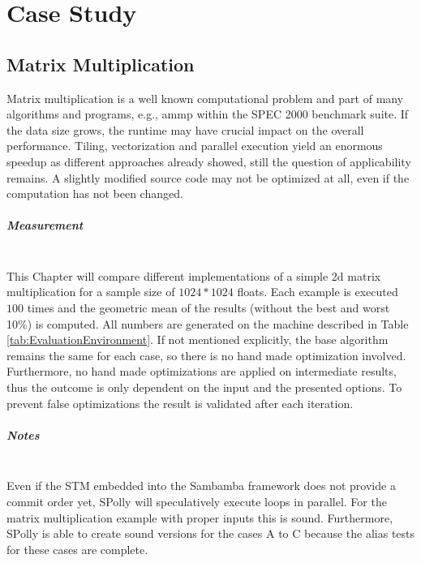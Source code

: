 
\chapter{Case Study} %
\label{Chapter6}


\section{Matrix Multiplication}
\label{MatrixMultiplication}
Matrix multiplication is a well known computational problem and part of many 
algorithms and programs, e.g., ammp within the SPEC 2000 benchmark suite.
If the data size grows, the runtime may have crucial impact on the
overall performance. Tiling, vectorization and parallel execution yield an
enormous speedup as different approaches already
showed\cite{grosser:thesis, JIMBOREAN-2012-664345},
still the question of applicability remains. A slightly modified source code 
may not be optimized at all, even if the computation has not been changed. 

\paragraph{Measurement} ~\\
This Chapter will compare different implementations of a simple 2d
matrix multiplication for a sample size of  $1024*1024$ floats.
Each example is executed $100$ times and the geometric mean of the results 
(without the best and worst 10\%) is computed. All numbers are generated on 
the machine described in Table \ref{tab:EvaluationEnvironment}. 
If not mentioned explicitly, the base
algorithm remains the same for each case, so there is no hand made optimization 
involved. Furthermore, no hand made optimizations are applied on intermediate 
results, thus the outcome is only dependent on the input and the presented 
options. To prevent false optimizations the result is validated after each iteration.

\paragraph{Notes} ~\\
Even if the STM embedded into the Sambamba framework does
not provide a commit order yet, SPolly will speculatively execute loops in
parallel. For the matrix multiplication example with proper inputs 
this is sound. Furthermore, SPolly is able to create sound versions for the cases 
A to C because the alias tests for these cases are complete. 

